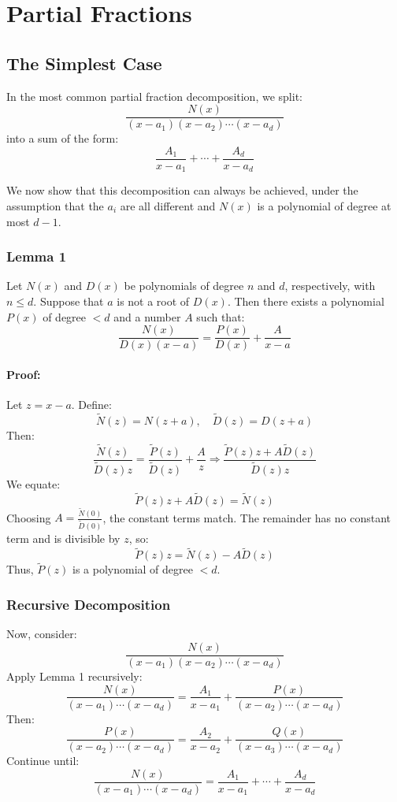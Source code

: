 \section{Partial Fractions}

\subsection{The Simplest Case}

In the most common partial fraction decomposition, we split:
\[
\frac{N(x)}{(x - a_1)(x - a_2)\cdots(x - a_d)}
\]
into a sum of the form:
\[
\frac{A_1}{x - a_1} + \cdots + \frac{A_d}{x - a_d}
\]

We now show that this decomposition can always be achieved, under the assumption that the $a_i$ are all different and $N(x)$ is a polynomial of degree at most $d - 1$.

\subsubsection{Lemma 1}

Let $N(x)$ and $D(x)$ be polynomials of degree $n$ and $d$, respectively, with $n \leq d$. Suppose that $a$ is not a root of $D(x)$. Then there exists a polynomial $P(x)$ of degree $< d$ and a number $A$ such that:
\[
\frac{N(x)}{D(x)(x - a)} = \frac{P(x)}{D(x)} + \frac{A}{x - a}
\]

\paragraph{Proof:} Let $z = x - a$. Define:
\[
\tilde{N}(z) = N(z + a), \quad \tilde{D}(z) = D(z + a)
\]
Then:
\[
\frac{\tilde{N}(z)}{\tilde{D}(z)z} = \frac{\tilde{P}(z)}{\tilde{D}(z)} + \frac{A}{z}
\Rightarrow \frac{\tilde{P}(z)z + A\tilde{D}(z)}{\tilde{D}(z)z}
\]
We equate:
\[
\tilde{P}(z)z + A\tilde{D}(z) = \tilde{N}(z)
\]
Choosing $A = \frac{\tilde{N}(0)}{\tilde{D}(0)}$, the constant terms match. The remainder has no constant term and is divisible by $z$, so:
\[
\tilde{P}(z)z = \tilde{N}(z) - A\tilde{D}(z)
\]
Thus, $\tilde{P}(z)$ is a polynomial of degree $< d$.

\subsubsection{Recursive Decomposition}

Now, consider:
\[
\frac{N(x)}{(x - a_1)(x - a_2)\cdots(x - a_d)}
\]
Apply Lemma 1 recursively:
\[
\frac{N(x)}{(x - a_1)\cdots(x - a_d)} = \frac{A_1}{x - a_1} + \frac{P(x)}{(x - a_2)\cdots(x - a_d)}
\]
Then:
\[
\frac{P(x)}{(x - a_2)\cdots(x - a_d)} = \frac{A_2}{x - a_2} + \frac{Q(x)}{(x - a_3)\cdots(x - a_d)}
\]
Continue until:
\[
\frac{N(x)}{(x - a_1)\cdots(x - a_d)} = \frac{A_1}{x - a_1} + \cdots + \frac{A_d}{x - a_d}
\]

